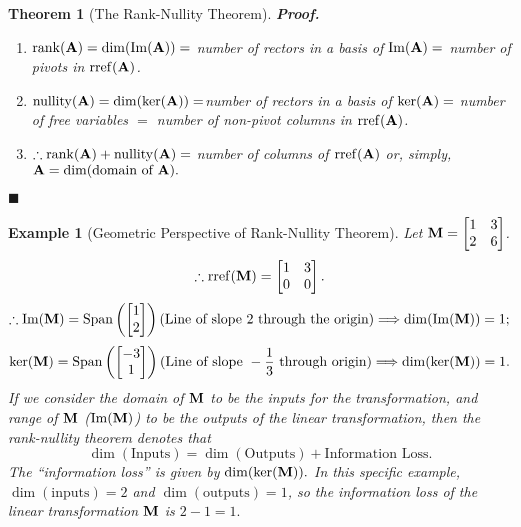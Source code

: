 \documentclass[12pt, a4paper]{article}
\newtheorem{thm}{Theorem}[subsection]
\newtheorem{eg}{Example}[subsection]
\newenvironment*{prf}{\par\indent\textbf{\textit{Proof. }}}{\hfill $\blacksquare$\par}
\def\IM{{\mathrm{Im}}}
\def\rref{\mathrm{rref}}
\def\Span{\mathrm{Span}}
\def\rank{\mathrm{rank}}
\def\nullity{\mathrm{nullity}}
\def\matrixA{\vb{A}}
\def\matrixM{\vb{M}}
\begin{document}
\begin{thm}[The Rank-Nullity Theorem]
	\begin{prf}
		\begin{enumerate}
			\item $\rank(\matrixA)=\dim(\IM(\matrixA))=$ number of rectors in a basis of $\IM(\matrixA)=$ number of pivots in $\rref(\matrixA)$.
			\item  $\nullity(\matrixA)=\dim(\ker(\matrixA))=$number of rectors in a basis of $\ker(\matrixA)=$ number of free variables $=$ number of non-pivot columns in $\rref(\matrixA)$.
			\item $\therefore\rank(\matrixA)+\nullity(\matrixA)=$ number of columns of $\rref(\matrixA)$ or, simply, $\matrixA=\dim(\text{domain of }\matrixA).$
		\end{enumerate}
	\end{prf}
\end{thm}
\begin{eg}[Geometric Perspective of Rank-Nullity Theorem]
	Let $\matrixM=\begin{bmatrix}1&3\\2&6\end{bmatrix}$.\[\therefore\rref(\matrixM)=\begin{bmatrix}1&3\\0&0\end{bmatrix}.\]
	\[\therefore\IM(\matrixM)=\Span\left(\begin{bmatrix}1\\2\end{bmatrix}\right) (\text{Line of slope }2\text{ through the origin})\Longrightarrow\dim(\IM(\matrixM))=1;\]
	\[\ker(\matrixM)=\Span\left(\begin{bmatrix}-3\\1\end{bmatrix}\right)(\text{Line of slope }-\frac{1}{3}\text{ through origin})\Longrightarrow\dim(\ker(\matrixM))=1.\] 
	If we consider the domain of $\matrixM$ to be the inputs for the transformation, and range of $\matrixM$ ($\IM(\matrixM)$) to be the outputs of the linear transformation, then the rank-nullity theorem denotes that \[\dim(\text{Inputs})=\dim(\text{Outputs})+\text{Information Loss}.\]
	The ``information loss'' is given by $\dim(\ker(\matrixM)).$ In this specific example, $\dim(\text{inputs})=2$ and $\dim(\text{outputs})=1$, so the information loss of the linear transformation $\matrixM$ is $2-1=1.$
	\begin{center}
		\begin{tikzpicture}[x=0.75pt,y=0.75pt,yscale=-1,xscale=1]

\end{tikzpicture}
\end{center}
\end{eg}
\end{document}

